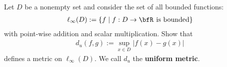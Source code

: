 \documentclass[10pt,twoside,openany]{memoir}
\begin{document}
    \begin{exercise}
        Let $D$ be a nonempty set and consider the set of all bounded functions:
            \begin{equation*}
            \begin{split}
                \ell_\infty(D) := \{f \mid f:D \rightarrow \bfR \hspace{4pt}\text{is bounded}\}
            \end{split}
            \end{equation*}
        with point-wise addition and scalar multiplication. Show that
            \begin{equation*}
            \begin{split}
                d_u(f,g) := \sup_{x \in D}\left|f(x) - g(x)\right|
            \end{split}
            \end{equation*}
        defines a metric on $\ell_\infty(D)$. We call $d_u$ the \textbf{uniform metric}.
    \end{exercise}
\end{document}
